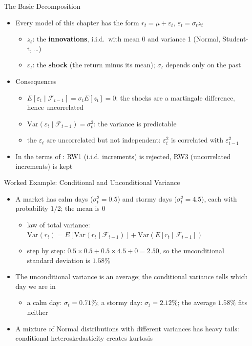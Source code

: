 \begin{frame}{The Basic Decomposition}
\itemsize{\small}
\begin{itemize}
    \item Every model of this chapter has the form $r_t = \mu + \varepsilon_t$, \quad $\varepsilon_t = \sigma_t z_t$
    \begin{itemize}
        \item $z_t$: the \textbf{innovations}, i.i.d.\ with mean 0 and variance 1 (Normal, Student-t, \dots)
        \item $\varepsilon_t$: the \textbf{shock} (the return minus its mean); $\sigma_t$ depends only on the past
    \end{itemize}
    \item Consequences
    \begin{itemize}
        \item $E[\varepsilon_t \mid \mathcal{F}_{t-1}] = \sigma_t E[z_t] = 0$: the shocks are a martingale difference, hence uncorrelated
        \item $\mathrm{Var}(\varepsilon_t \mid \mathcal{F}_{t-1}) = \sigma_t^2$: the variance is predictable
        \item the $\varepsilon_t$ are uncorrelated but not independent: $\varepsilon_t^2$ is correlated with $\varepsilon_{t-1}^2$
    \end{itemize}
    \item In the terms of : RW1 (i.i.d. increments) is rejected, RW3 (uncorrelated increments) is kept
\end{itemize}
\end{frame}

\begin{frame}{Worked Example: Conditional and Unconditional Variance}
\itemsize{\small}
\begin{itemize}
    \item A market has calm days ($\sigma_t^2 = 0.5$) and stormy days ($\sigma_t^2 = 4.5$), each with probability $1/2$; the mean is 0
    \begin{itemize}
        \item law of total variance: $\mathrm{Var}(r_t) = E[\mathrm{Var}(r_t \mid \mathcal{F}_{t-1})] + \mathrm{Var}(E[r_t \mid \mathcal{F}_{t-1}])$
        \item step by step: $0.5 \times 0.5 + 0.5 \times 4.5 + 0 = 2.50$, so the unconditional standard deviation is $1.58\%$
    \end{itemize}
    \item The unconditional variance is an average; the conditional variance tells which day we are in
    \begin{itemize}
        \item a calm day: $\sigma_t = 0.71\%$; a stormy day: $\sigma_t = 2.12\%$; the average $1.58\%$ fits neither
    \end{itemize}
    \item A mixture of Normal distributions with different variances has heavy tails: conditional heteroskedasticity creates kurtosis
\end{itemize}
\end{frame}



